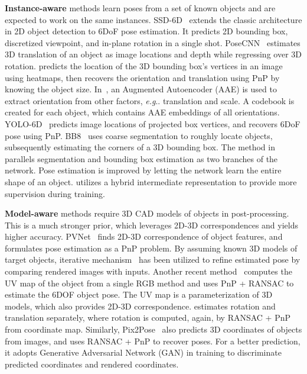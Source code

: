 \documentclass[runningheads]{llncs}
\makeatletter
\DeclareRobustCommand\onedot{\futurelet\@let@token\@onedot}
\def\@onedot{\ifx\@let@token.\else.\null\fi\xspace}
\def\eg{\emph{e.g}\onedot} \def\Eg{\emph{E.g}\onedot}
\makeatother
\begin{document}
\textbf{Instance-aware} methods learn poses from a set of known objects and are expected to work on the same instances. SSD-6D~\cite{Kehl_2017_SSD6D} extends the classic architecture in 2D object detection to 6DoF pose estimation. It predicts 2D bounding box, discretized viewpoint, and in-plane rotation in a single shot. PoseCNN~\cite{Xiang_2018_PoseCNN} estimates 3D translation of an object as image locations and depth while regressing over 3D rotation. \cite{Tremblay_2018_Dope} predicts the location of the 3D bounding box's vertices in an image using heatmaps, then recovers the orientation and translation using PnP by knowing the object size. In~\cite{Sundermeyer_2018_Implicit}, an Augmented Autoencoder (AAE) is used to extract orientation from other factors, \eg translation and scale. A codebook is created for each object, which contains AAE embeddings of all orientations. YOLO-6D~\cite{Tekin_2018_SingleShot} predicts image locations of projected box vertices, and recovers 6DoF pose using PnP. BB8~\cite{Rad_2017_BB8} uses coarse segmentation to roughly locate objects, subsequently estimating the corners of a 3D bounding box. The method in~\cite{Hu_2019_Segmentation} parallels segmentation and bounding box estimation as two branches of the network. Pose estimation is improved by letting the network learn the entire shape of an object. \cite{Song_2020_Hybrid} utilizes a hybrid intermediate representation to provide more supervision during training.

\textbf{Model-aware} methods require 3D CAD models of objects in post-processing. This is a much stronger prior, which leverages 2D-3D correspondences and yields higher accuracy. PVNet~\cite{Peng_2019_PVNet} finds 2D-3D correspondence of object features, and formulates pose estimation as a PnP problem. By assuming known 3D models of target objects, iterative mechanism~\cite{Li_2018_DeepIM} has been utilized to refine estimated pose by comparing rendered images with inputs. Another recent method~\cite{Zakharov_2019_DPOD} computes the UV map of the object from a single RGB method and uses PnP + RANSAC to estimate the 6DOF object pose. The UV map is a parameterization of 3D models, which also provides 2D-3D correspondence. \cite{Li_2019_CDPN} estimates rotation and translation separately, where rotation is computed, again, by RANSAC + PnP from coordinate map. Similarly, Pix2Pose~\cite{Park_2019_Pix2Pose} also predicts 3D coordinates of objects from images, and uses RANSAC + PnP to recover poses. For a better prediction, it adopts Generative
Adversarial Network (GAN) in training to discriminate predicted coordinates and rendered coordinates.
\end{document}
